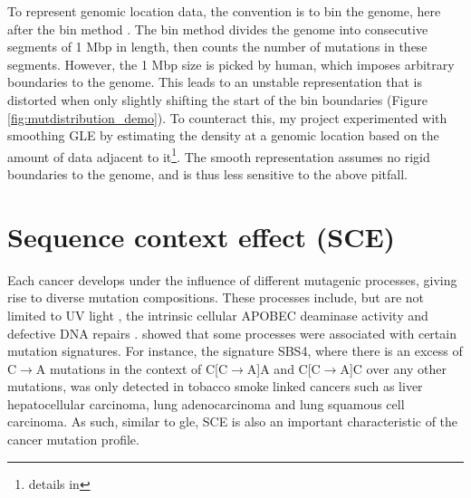 To represent genomic location data, the convention is to bin the genome, here after the bin method \citep{Kubler2019, Salvadores2019PassengerTumors, Chalmers2017AnalysisBurden, Salvadores2020MatchingPatterns}. The bin method divides the genome into consecutive segments of 1 Mbp in length, then counts the number of mutations in these segments. However, the 1 Mbp size is picked by human, which imposes arbitrary boundaries to the genome. This leads to an unstable representation that is distorted when only slightly shifting the start of the bin boundaries (Figure \ref{fig:mutdistribution_demo}). To counteract this, my project experimented with smoothing GLE by estimating the \gls{density} at a genomic location based on the amount of data adjacent to it\footnote{details in }. The smooth representation assumes no rigid boundaries to the genome, and is thus less sensitive to the above pitfall. 


\newpage
\section{Sequence context effect (SCE)}
\label{intro:sce}

Each cancer develops under the influence of different mutagenic processes, giving rise to diverse mutation compositions. These processes include, but are not limited to UV light \citep[known to drive skin melanoma;][]{Mohania2017}, the intrinsic cellular APOBEC deaminase activity \citep[\textit{e.g.} in B cells;][]{Kuppers2005MechanismsPathogenesis} and defective DNA repairs \citep[\textit{e.g.} mutated \textit{BRCA} genes in breast cancer;][]{Navasardyan2021YY1TNBC}. \citet{Alexandrov2013, Alexandrov2020} showed that some processes were associated with certain mutation signatures. For instance, the signature SBS4, where there is an excess of C$\rightarrow$A mutations in the context of C[C$\rightarrow$A]A and C[C$\rightarrow$A]C over any other mutations, was only detected in tobacco smoke linked cancers such as liver hepatocellular carcinoma, lung adenocarcinoma and lung squamous cell carcinoma. As such, similar to \gls{gle}, SCE is also an important characteristic of the cancer mutation profile. 

